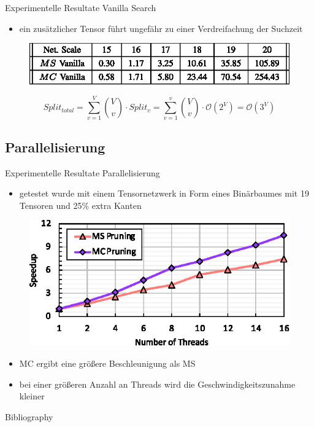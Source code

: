 \documentclass{beamer}
\begin{document}
		\begin{frame}{Experimentelle Resultate Vanilla Search}
			\begin{itemize}
				\item ein zusätzlicher Tensor führt ungefähr zu einer Verdreifachung der Suchzeit
			\end{itemize}
			\begin{figure}
				\includegraphics{table_02}
			\end{figure}
			\begin{equation*}
				Split_{total} = \sum^V_{v=1} \binom{V}{v} \cdot Split_v = \sum^v_{v=1} \binom{V}{v} \cdot \mathcal{O} \left(2^V \right) = \mathcal{O} \left(3^V \right)
			\end{equation*}
		\end{frame}

	\subsection{Parallelisierung}

		\begin{frame}{Experimentelle Resultate Parallelisierung}
			\begin{itemize}
				\item getestet wurde mit einem Tensornetzwerk in Form eines Binärbaumes mit 19 Tensoren und 25\% extra Kanten
			\end{itemize}
			\begin{figure}
				\includegraphics{figure_13}
			\end{figure} \pause
			\begin{itemize}
				\item MC ergibt eine größere Beschleunigung als MS
				\item bei einer größeren Anzahl an Threads wird die Geschwindigkeitszunahme kleiner
			\end{itemize}
		\end{frame}
	
	
	\begin{frame}[allowframebreaks]{Bibliography}
		
		
	\end{frame}
	
\end{document}
